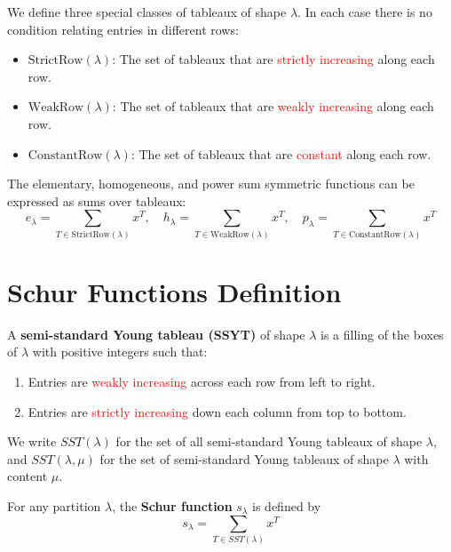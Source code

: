 \documentclass[12pt]{memoir}
\begin{document}
We define three special classes of tableaux of shape $\lambda$.  In each
case there is no condition relating entries in different rows:
\begin{itemize}
    \item $\text{StrictRow}(\lambda)$: The set of tableaux that are \textcolor{red}{strictly increasing} along each row.
    \item $\text{WeakRow}(\lambda)$: The set of tableaux that are \textcolor{red}{weakly increasing} along each row.
    \item $\text{ConstantRow}(\lambda)$: The set of tableaux that are \textcolor{red}{constant} along each row.
\end{itemize}

\begin{ptcb}
\begin{Prop}
The elementary, homogeneous, and power sum symmetric functions can be expressed as sums over tableaux:
\[
e_\lambda = \sum_{T \in \text{StrictRow}(\lambda)} x^T, \quad h_\lambda = \sum_{T \in \text{WeakRow}(\lambda)} x^T, \quad p_\lambda = \sum_{T \in \text{ConstantRow}(\lambda)} x^T
\]
\end{Prop}
\end{ptcb}

\newpage

\section{Schur Functions Definition}

\begin{ptcb}
\begin{Def}
A \textbf{semi-standard Young tableau (SSYT)} of shape $\lambda$ is a filling of the boxes of $\lambda$ with positive integers such that:
\begin{enumerate}
    \item Entries are \textcolor{red}{weakly increasing} across each row from left to right.
    \item Entries are \textcolor{red}{strictly increasing} down each column from top to bottom.
\end{enumerate}
We write $SST(\lambda)$ for the set of all semi-standard Young tableaux of shape $\lambda$, and $SST(\lambda, \mu)$ for the set of semi-standard Young tableaux of shape $\lambda$ with content $\mu$.
\end{Def}
\end{ptcb}

\begin{ptcb}
\begin{Def}
For any partition $\lambda$, the \textbf{Schur function} $s_\lambda$ is defined by
\[
s_\lambda = \sum_{T \in SST(\lambda)} x^T
\]
\end{Def}
\end{ptcb}
\end{document}
